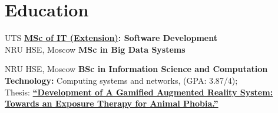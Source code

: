 \documentclass[]{cv-class}
\begin{document}
\begin{minipage}[t]{0.35\textwidth}
\smallSeparator{0.4pt}
\section{Education}
    {UTS}
    {\textbf{\href{https://www.uts.edu.au/future-students/find-a-course/master-information-technology-extension}{MSc of IT (Extension)}: Software Development}} \\

    {NRU HSE, Moscow}
    {\textbf{MSc in Big Data Systems}}

    {NRU HSE, Moscow}
    {\textbf{BSc in Information Science and Computation Technology:} Computing systems and networks, (GPA: 3.87/4); \\
    Thesis: \href{https://github.com/anskuratov/ar-mr-therapy}{\textbf{``Development of A Gamified Augmented Reality System: Towards an Exposure Therapy for Animal Phobia.''}}
    }

\end{minipage}
\hfill
\end{document}
